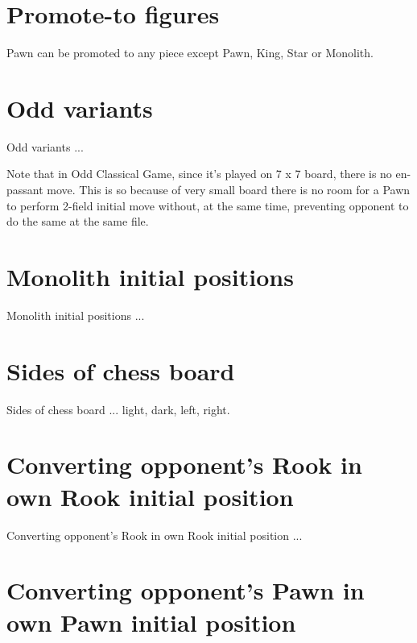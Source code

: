 
\section*{Promote-to figures}

Pawn can be promoted to any piece except Pawn, King, Star or Monolith.

\section*{Odd variants}

Odd variants ...

Note that in Odd Classical Game, since it's played on 7 x 7 board,
there is no en-passant move. This is so because of very small board
there is no room for a Pawn to perform 2-field initial move without,
at the same time, preventing opponent to do the same at the same file.

\section*{Monolith initial positions}

Monolith initial positions ...

\section*{Sides of chess board}

Sides of chess board ... light, dark, left, right.

\section*{Converting opponent's Rook in own Rook initial position}

Converting opponent's Rook in own Rook initial position ...

\section*{Converting opponent's Pawn in own Pawn initial position}


